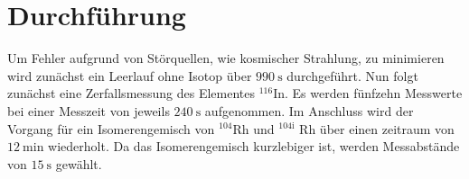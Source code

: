 
\section{Durchführung}
\label{sec:Durchführung}
Um Fehler aufgrund von Störquellen, wie kosmischer Strahlung, zu minimieren wird zunächst ein Leerlauf ohne Isotop über $\SI{990}{\second}$ durchgeführt. Nun folgt zunächst eine Zerfallsmessung des Elementes $^{116}$In. Es werden fünfzehn Messwerte bei
 einer Messzeit von jeweils $\SI{240}{\second}$ aufgenommen. Im Anschluss wird der Vorgang für ein Isomerengemisch von $^{104}$Rh und $^{104\text{i}}$ Rh über einen zeitraum von $\SI{12}{\minute}$ wiederholt. Da das Isomerengemisch kurzlebiger ist, werden Messabstände von $\SI{15}{\second}$ gewählt.
